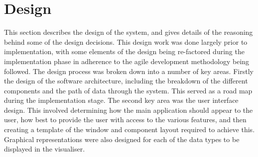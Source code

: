 
\chapter[Design]{Design} %

\label{Chapter8} %


This section describes the design of the system, and gives details of the reasoning behind some of the design decisions. This design work was done largely prior to implementation, with some elements of the design being re-factored during the implementation phase in adherence to the agile development methodology being followed. The design process was broken down into a number of key areas. Firstly the design of the software architecture, including the breakdown of the different components and the path of data through the system. This served as a road map during the implementation stage. The second key area was the user interface design. This involved determining how the main application should appear to the user, how best to provide the user with access to the various features, and then creating a template of the window and component layout required to achieve this. Graphical representations were also designed for each of the data types to be displayed in the visualiser.


